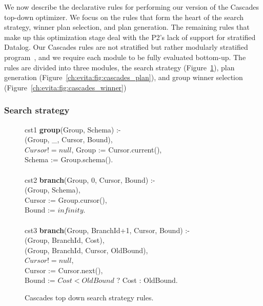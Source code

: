 We now describe the declarative rules for performing our version of the Cascades top-down optimizer. 
We focus on the rules that form the heart of the search strategy, winner plan selection, and plan generation.
The remaining rules that make up this optimization stage deal with the P2's lack of support for stratified Datalog.
Our Cascades rules are not stratified but rather modularly stratified program~\cite{rossmodular}, and we
require each module to be fully evaluated bottom-up. The rules are divided into three modules, the 
search strategy (Figure~\ref{ch:evita:fig:cascades_top_down}), plan generation 
(Figure~\ref{ch:evita:fig:cascades_plan}), and group winner selection (Figure~\ref{ch:evita:fig:cascades_winner})

\subsubsection{Search strategy}

\begin{figure}
\ssp
\centering
\begin{boxedminipage}{\linewidth}
cst1 {\bf group}(Group, Schema) :- \\
(Group, \_, Cursor, Bound), \\
\datalogspace $Cursor != null$,
\datalogspace Group := Cursor.current(), \\
\datalogspace Schema := Group.schema(). \\
\\
cst2 {\bf branch}(Group, 0, Cursor, Bound) :- \\
(Group, Schema), \\
\datalogspace Cursor := Group.cursor(), \\
\datalogspace Bound  := $infinity$. \\
\\
cst3 {\bf branch}(Group, BranchId+1, Cursor, Bound) :- \\
(Group, BranchId, Cost), \\
(Group, BranchId, Cursor, OldBound), \\
\datalogspace $Cursor != null$, \\
\datalogspace Cursor := Cursor.next(), \\
\datalogspace Bound := $Cost < OldBound$ ? Cost : OldBound. \\
  
\end{boxedminipage}
\caption{\label{ch:evita:fig:cascades_top_down} Cascades top down search strategy rules.}
\end{figure}


